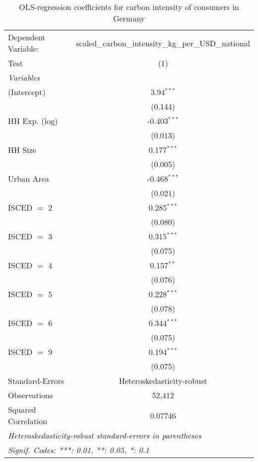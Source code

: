 
\begin{table}[htbp!]
   \centering
   \small
   \begin{adjustbox}{width = 1\textwidth, max height = 0.95\textheight, center}
      \begin{threeparttable}[b]
         \caption{\label{tab:OLS_1_DEU} OLS-regression coefficients for carbon intensity of consumers in Germany}
         \begin{tabular}{lc}
            \tabularnewline \midrule \midrule
            Dependent Variable: & scaled\_carbon\_intensity\_kg\_per\_USD\_national\\        
            Test                & (1)\\  
            \midrule
            \emph{Variables}\\
            (Intercept)         & 3.94$^{***}$\\   
                                & (0.144)\\   
            HH Exp. (log)       & -0.403$^{***}$\\   
                                & (0.013)\\   
            HH Size             & 0.177$^{***}$\\   
                                & (0.005)\\   
            Urban Area          & -0.468$^{***}$\\   
                                & (0.021)\\   
            ISCED $=$ 2         & 0.285$^{***}$\\   
                                & (0.080)\\   
            ISCED $=$ 3         & 0.315$^{***}$\\   
                                & (0.075)\\   
            ISCED $=$ 4         & 0.157$^{**}$\\   
                                & (0.076)\\   
            ISCED $=$ 5         & 0.228$^{***}$\\   
                                & (0.078)\\   
            ISCED $=$ 6         & 0.344$^{***}$\\   
                                & (0.075)\\   
            ISCED $=$ 9         & 0.194$^{***}$\\   
                                & (0.075)\\   
            \midrule 
            Standard-Errors     & Heteroskedasticity-robust \\   
            Observations        & 52,412\\  
            Squared Correlation & 0.07746\\  
            \midrule \midrule
            \multicolumn{2}{l}{\emph{Heteroskedasticity-robust standard-errors in parentheses}}\\
            \multicolumn{2}{l}{\emph{Signif. Codes: ***: 0.01, **: 0.05, *: 0.1}}\\
         \end{tabular}
         

\end{threeparttable}
\end{adjustbox}
\end{table}
